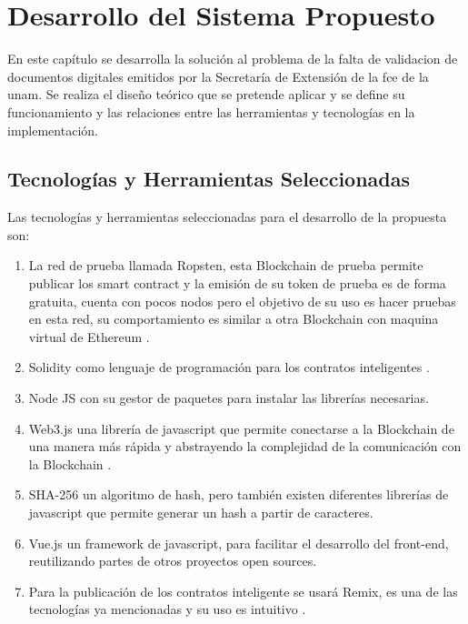 \chapter{Desarrollo del Sistema Propuesto}
En este capítulo se desarrolla la solución al problema de la falta de validacion de documentos digitales emitidos por la Secretaría 
de Extensión de la \gls{fce} de la \gls{unam}.
Se realiza el diseño teórico que se pretende aplicar y se define su funcionamiento y las relaciones entre las
herramientas y tecnologías en la implementación. 

\section{Tecnologías y Herramientas Seleccionadas}
Las tecnologías y herramientas seleccionadas para el desarrollo de la propuesta son:
\begin{enumerate}
    \item La red de prueba llamada Ropsten, esta  Blockchain de prueba  permite publicar los smart contract
    y la emisión de su token de prueba es de forma gratuita, cuenta con pocos nodos pero el objetivo 
    de su uso es hacer pruebas en esta red, su comportamiento es similar a otra  Blockchain con maquina virtual de Ethereum \cite[]{dannen_introducing_2017}.
    \item Solidity como lenguaje de programación para los contratos inteligentes \cite[]{dannen_introducing_2017,bragagnolo_smartinspect_2018}.
    \item Node JS con su gestor de paquetes para instalar las librerías necesarias.
    \item Web3.js una librería de javascript que permite conectarse a la  Blockchain de una manera más rápida y abstrayendo la complejidad de la comunicación
    con la Blockchain \cite[]{dannen_introducing_2017}.
    \item SHA-256 un algoritmo de hash, pero también existen diferentes  librerías de  javascript que permite generar un hash a partir de caracteres.
    \item Vue.js un framework de javascript, para facilitar el desarrollo del front-end, reutilizando partes de otros proyectos open sources.\cite[]{vuejs_introduction_nodate}
    \item Para la publicación de los contratos inteligente se usará Remix, es una de las tecnologías ya mencionadas y su uso 
    es intuitivo \cite[]{remix_deploy_nodate}.

\end{enumerate}

